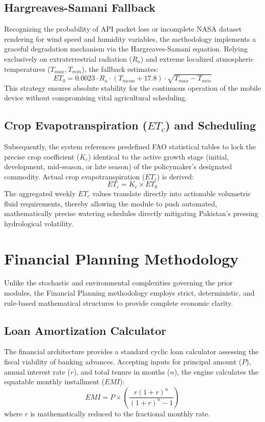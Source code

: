 \subsection{Hargreaves-Samani Fallback}
Recognizing the probability of API packet loss or incomplete NASA dataset rendering for wind speed and humidity variables, the methodology implements a graceful degradation mechanism via the Hargreaves-Samani equation. Relying exclusively on extraterrestrial radiation ($R_a$) and extreme localized atmospheric temperatures ($T_{max}, T_{min}$), the fallback estimates:
\begin{equation}
    ET_0 = 0.0023 \cdot R_a \cdot (T_{mean} + 17.8) \cdot \sqrt{T_{max} - T_{min}}
\end{equation}
This strategy ensures absolute stability for the continuous operation of the mobile device without compromising vital agricultural scheduling.

\subsection{Crop Evapotranspiration ($ET_c$) and Scheduling}
Subsequently, the system references predefined FAO statistical tables to lock the precise crop coefficient ($K_c$) identical to the active growth stage (initial, development, mid-season, or late season) of the policymaker's designated commodity. Actual crop evapotranspiration ($ET_c$) is derived:
\begin{equation}
    ET_c = K_c \times ET_0
\end{equation}
The aggregated weekly $ET_c$ values translate directly into actionable volumetric fluid requirements, thereby allowing the module to push automated, mathematically precise watering schedules directly mitigating Pakistan's pressing hydrological volatility.

\section{Financial Planning Methodology}

Unlike the stochastic and environmental complexities governing the prior modules, the Financial Planning methodology employs strict, deterministic, and rule-based mathematical structures to provide complete economic clarity.

\subsection{Loan Amortization Calculator}
The financial architecture provides a standard cyclic loan calculator assessing the fiscal viability of banking advances. Accepting inputs for principal amount ($P$), annual interest rate ($r$), and total tenure in months ($n$), the engine calculates the equatable monthly installment ($EMI$):
\begin{equation}
    EMI = P \times \left( \frac{r(1+r)^n}{(1+r)^n - 1} \right)
\end{equation}
where $r$ is mathematically reduced to the fractional monthly rate.

